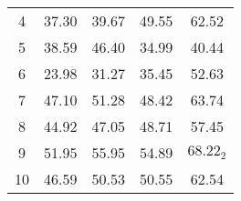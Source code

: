 \begin{table}[htp!]
\begin{tabular}{c|cccc}
4                           & \cellcolor[HTML]{C0C0C0}37.30          & \cellcolor[HTML]{C0C0C0}39.67           & \cellcolor[HTML]{C0C0C0}49.55           & \cellcolor[HTML]{C0C0C0}62.52                                \\ \cline{2-5}
5                           & 38.59                                  & 46.40                                   & 34.99                                   & 40.44                                                        \\ \cline{2-5}
6                           & 23.98                                  & 31.27                                   & 35.45                                   & 52.63                                                        \\ \cline{2-5}
7                           & 47.10                                  & 51.28                                   & 48.42                                   & 63.74                                                        \\ \cline{2-5}
8                           & \cellcolor[HTML]{C0C0C0}44.92          & \cellcolor[HTML]{C0C0C0}47.05           & \cellcolor[HTML]{C0C0C0}48.71           & \cellcolor[HTML]{C0C0C0}57.45                                \\ \cline{2-5}
9                           & \cellcolor[HTML]{C0C0C0}51.95          & \cellcolor[HTML]{C0C0C0}55.95           & \cellcolor[HTML]{C0C0C0}54.89           & \cellcolor[HTML]{C0C0C0}$68.22_2$                            \\ \cline{2-5}
10                          & \cellcolor[HTML]{C0C0C0}46.59          & \cellcolor[HTML]{C0C0C0}50.53           & \cellcolor[HTML]{C0C0C0}50.55           & \cellcolor[HTML]{C0C0C0}62.54                                \\ \hline
\end{tabular}
\end{table}


